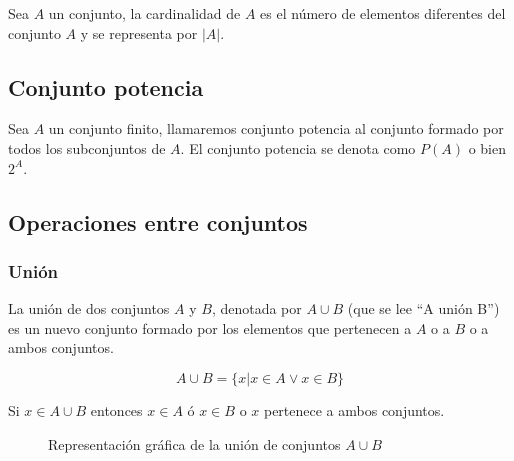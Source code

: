 Sea $A$ un conjunto, la cardinalidad de $A$ es el número de elementos diferentes
del conjunto $A$ y se representa por $|A|$.

\subsection*{Conjunto potencia}
Sea $A$ un conjunto finito, llamaremos conjunto potencia al conjunto formado por
todos los subconjuntos de $A$. El conjunto potencia se denota como $P(A)$ o bien
$2^A$.

\subsection*{Operaciones entre conjuntos}

\def\firstcircle{(0,0) circle (1.5cm)}
\def\secondcircle{(0:2cm) circle (1.5cm)}
\def\rectangle{(-2,-2) rectangle (4,2)}



\setlength{\parskip}{5mm}

\subsubsection*{Unión}

La unión de dos conjuntos $A$ y $B$, denotada por $ A \cup B $ (que se lee “A
unión B”) es un nuevo conjunto formado por los elementos que pertenecen a $A$ o
a $B$ o a ambos conjuntos.

\begin{equation}
    A \cup B = \{x | x \in A \vee x \in B\}
\end{equation}

Si $x \in A \cup B $ entonces $x \in A $ ó $x \in B$ o $x$ pertenece a ambos
conjuntos.

\begin{figure}[h]
    \centering
    \caption{Representación gráfica de la unión de conjuntos $A \cup B$}
    \label{fig:unionConjuntos}
\end{figure}

